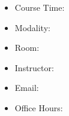 \begin{itemize}[label={},leftmargin=0pt]
    \item Course Time: \coursetime
    \item Modality: \modality %
    \item Room: \room %
    \item Instructor: \instructor
    \item Email: \email
    \item Office Hours: \officehours
\end{itemize}